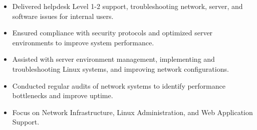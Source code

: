\par\smallskip
\noindent
\begin{minipage}{20cm}
  \begin{minipage}{9.75cm}
    \begin{itemize}
      \item Delivered helpdesk Level 1-2 support, troubleshooting network, server, and software issues for internal users.
      \item Ensured compliance with security protocols and optimized server environments to improve system performance.
    \end{itemize}
  \end{minipage}
  \hfill
  \begin{minipage}{9.75cm}
    \begin{itemize}
      \item Assisted with server environment management, implementing and troubleshooting Linux systems, and improving network configurations.
      \item Conducted regular audits of network systems to identify performance bottlenecks and improve uptime.
    \end{itemize}
  \end{minipage}
\end{minipage}

\begin{itemize}
  \item Focus on Network Infrastructure, Linux Administration, and Web Application Support.
\end{itemize}


\noindent
\begin{minipage}{20cm}
\end{minipage}


